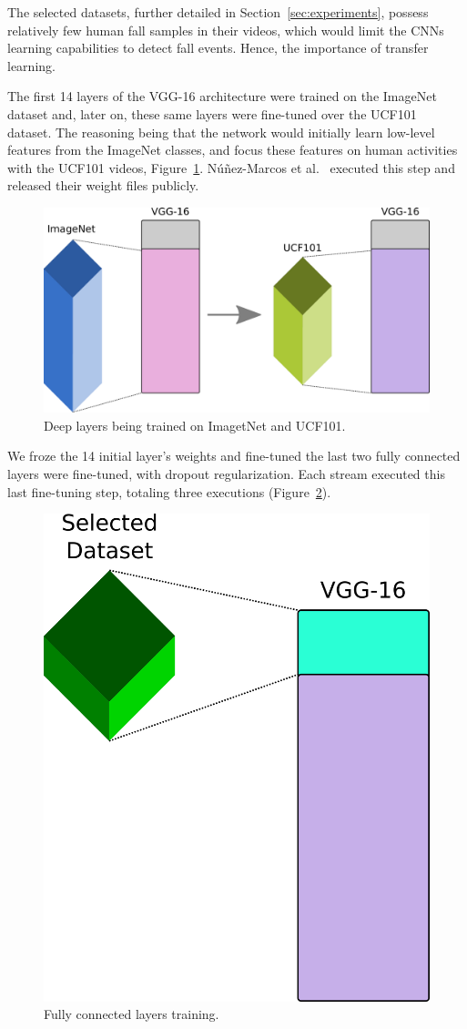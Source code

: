 \documentclass[conference]{IEEEtran}
\begin{document}
The selected datasets, further detailed in Section~\ref{sec:experiments}, possess relatively few human fall samples in their videos, which would limit the CNNs learning capabilities to detect fall events. Hence, the importance of transfer learning.\par
The first 14 layers of the VGG-16 architecture were trained on the ImageNet~\cite{imagenet_cvpr09} dataset and, later on, these same layers were fine-tuned over the UCF101~\cite{soomro2012ucf101} dataset. The reasoning being that the network would initially learn low-level features from the ImageNet classes, and focus these features on human activities with the UCF101 videos, Figure~\ref{fig:pre14}. N\'u\~nez-Marcos et al.~\cite{nunez2017vision} executed this step and released their weight files publicly.\par
\begin{figure}[htbp]
\centerline{\includegraphics[width=0.9\linewidth]{figures/pre14.png}}
\caption{Deep layers being trained on ImagetNet and UCF101.}
\label{fig:pre14}
\end{figure}
We froze the 14 initial layer's weights and fine-tuned the
last two fully connected layers were fine-tuned, with dropout
regularization. Each stream executed this last fine-tuning step,
totaling three executions (Figure~\ref{fig:pos14}).
\begin{figure}[htbp]
\centerline{\includegraphics[width=0.4\linewidth]{figures/pos14.png}}
\caption{Fully connected layers training.}
\label{fig:pos14}
\end{figure}
\end{document}
